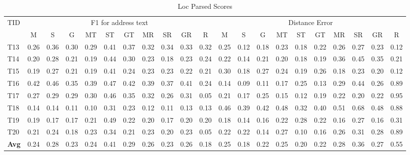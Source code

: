 \begin{table}
\caption{Loc Parsed Scores}
\label{tab:loc_parsed_scores}
\begin{tabular}{l|cccccccccc|cccccccccc}
\hline
\multirow{2}{*}{TID} & \multicolumn{10}{|c|}{F1 for address text} & \multicolumn{10}{c}{Distance Error} \\
\cline{2-21}
\multicolumn{1}{l|}{} & M & S & G & MT & ST & GT & MR & SR & GR & R & M & S & G & MT & ST & GT & MR & SR & GR & R \\
\hline
T13 & 0.26 & 0.36 & 0.30 & 0.29 & 0.41 & 0.37 & 0.32 & 0.34 & 0.33 & 0.32 & 0.25 & 0.12 & 0.18 & 0.23 & 0.18 & 0.22 & 0.26 & 0.27 & 0.23 & 0.12 \\
T14 & 0.20 & 0.28 & 0.21 & 0.19 & 0.44 & 0.30 & 0.23 & 0.18 & 0.23 & 0.24 & 0.22 & 0.14 & 0.21 & 0.20 & 0.18 & 0.19 & 0.36 & 0.45 & 0.35 & 0.21 \\
T15 & 0.19 & 0.27 & 0.21 & 0.19 & 0.41 & 0.24 & 0.23 & 0.23 & 0.22 & 0.21 & 0.30 & 0.18 & 0.27 & 0.24 & 0.19 & 0.26 & 0.18 & 0.23 & 0.20 & 0.12 \\
T16 & 0.42 & 0.46 & 0.35 & 0.39 & 0.47 & 0.42 & 0.39 & 0.37 & 0.41 & 0.24 & 0.14 & 0.09 & 0.11 & 0.17 & 0.25 & 0.13 & 0.29 & 0.44 & 0.26 & 0.89 \\
T17 & 0.27 & 0.29 & 0.29 & 0.30 & 0.46 & 0.35 & 0.32 & 0.26 & 0.31 & 0.05 & 0.21 & 0.17 & 0.25 & 0.15 & 0.12 & 0.19 & 0.22 & 0.20 & 0.22 & 0.95 \\
T18 & 0.14 & 0.14 & 0.11 & 0.10 & 0.31 & 0.23 & 0.12 & 0.11 & 0.13 & 0.13 & 0.46 & 0.39 & 0.42 & 0.48 & 0.32 & 0.40 & 0.51 & 0.68 & 0.48 & 0.88 \\
T19 & 0.19 & 0.17 & 0.17 & 0.21 & 0.49 & 0.22 & 0.20 & 0.17 & 0.20 & 0.20 & 0.18 & 0.14 & 0.16 & 0.22 & 0.28 & 0.22 & 0.16 & 0.27 & 0.16 & 0.31 \\
T20 & 0.21 & 0.24 & 0.18 & 0.23 & 0.34 & 0.21 & 0.23 & 0.20 & 0.23 & 0.05 & 0.22 & 0.22 & 0.14 & 0.27 & 0.10 & 0.16 & 0.26 & 0.31 & 0.28 & 0.89 \\
\hline
\textbf{Avg} & 0.24 & 0.28 & 0.23 & 0.24 & 0.41 & 0.29 & 0.26 & 0.23 & 0.26 & 0.18 & 0.25 & 0.18 & 0.22 & 0.25 & 0.20 & 0.22 & 0.28 & 0.36 & 0.27 & 0.55 \\
\hline
\end{tabular}
\end{table}